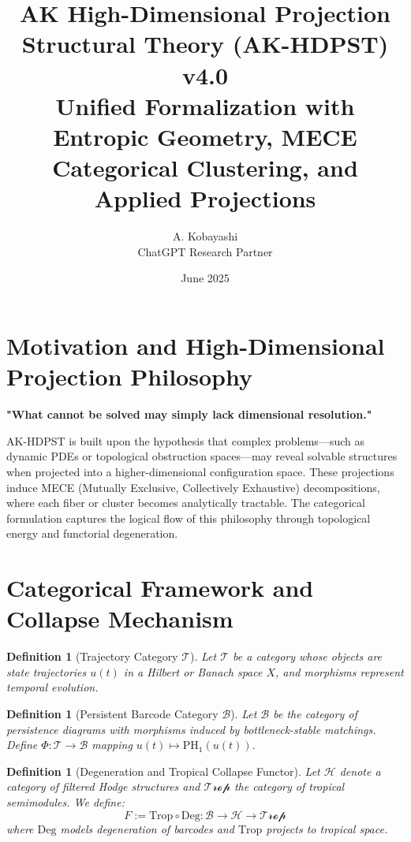 \documentclass[11pt]{article}
\title{AK High-Dimensional Projection Structural Theory (AK-HDPST) v4.0 \\ Unified Formalization with Entropic Geometry, MECE Categorical Clustering, and Applied Projections}
\author{A. Kobayashi \\ ChatGPT Research Partner}
\date{June 2025}
\newtheorem{definition}[theorem]{Definition}
\begin{document}
\maketitle

\section{Motivation and High-Dimensional Projection Philosophy}

\textbf{"What cannot be solved may simply lack dimensional resolution."}

AK-HDPST is built upon the hypothesis that complex problems—such as dynamic PDEs or topological obstruction spaces—may reveal solvable structures when projected into a higher-dimensional configuration space. These projections induce MECE (Mutually Exclusive, Collectively Exhaustive) decompositions, where each fiber or cluster becomes analytically tractable. The categorical formulation captures the logical flow of this philosophy through topological energy and functorial degeneration.

\section{Categorical Framework and Collapse Mechanism}

\begin{definition}[Trajectory Category \( \mathcal{T} \)]
Let \( \mathcal{T} \) be a category whose objects are state trajectories \( u(t) \) in a Hilbert or Banach space \( X \), and morphisms represent temporal evolution.\end{definition}

\begin{definition}[Persistent Barcode Category \( \mathcal{B} \)]
Let \( \mathcal{B} \) be the category of persistence diagrams with morphisms induced by bottleneck-stable matchings. Define \( \Phi: \mathcal{T} \to \mathcal{B} \) mapping \( u(t) \mapsto \mathrm{PH}_1(u(t)) \).
\end{definition}

\begin{definition}[Degeneration and Tropical Collapse Functor]
Let \( \mathcal{H} \) denote a category of filtered Hodge structures and \( \mathcal{Trop} \) the category of tropical semimodules. We define:
\[ F := \mathrm{Trop} \circ \mathrm{Deg} : \mathcal{B} \to \mathcal{H} \to \mathcal{Trop} \]
where \( \mathrm{Deg} \) models degeneration of barcodes and \( \mathrm{Trop} \) projects to tropical space.
\end{definition}
\end{document}
